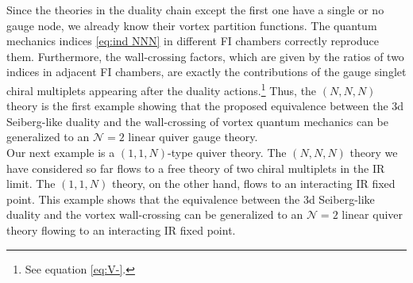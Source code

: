 \documentclass[a4paper,11pt]{article}
\begin{document}
Since the theories in the duality chain except the first one have a single or no gauge node, we already know their vortex partition functions. The quantum mechanics indices \eqref{eq:ind NNN} in different FI chambers correctly reproduce them. Furthermore, the wall-crossing factors, which are given by the ratios of two indices in adjacent FI chambers, are exactly the contributions of the gauge singlet chiral multiplets appearing after the duality actions.\footnote{See equation \eqref{eq:V-}.} Thus, the $(N,N,N)$ theory is the first example showing that the proposed equivalence between the 3d Seiberg-like duality and the wall-crossing of vortex quantum mechanics can be generalized to an $\mathcal N = 2$ linear quiver gauge theory.
\\


Our next example is a $(1,1,N)$-type quiver theory. The $(N,N,N)$ theory we have considered so far flows to a free theory of two chiral multiplets in the IR limit. The $(1,1,N)$ theory, on the other hand, flows to an interacting IR fixed point. This example shows that the equivalence between the 3d Seiberg-like duality and the vortex wall-crossing can be generalized to an $\mathcal N = 2$ linear quiver theory flowing to an interacting IR fixed point.
\end{document}
